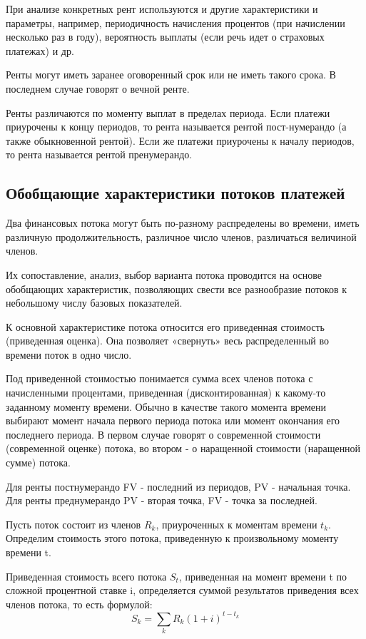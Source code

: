 \documentclass[aps,%
12pt,%
final,%
oneside,
onecolumn,%
musixtex, %
superscriptaddress,%
centertags]{article} %
\begin{document}
При анализе конкретных рент используются и другие характеристики и параметры, например, периодичность начисления процентов (при начислении несколько раз в году), вероятность выплаты (если речь идет о страховых платежах) и др.

Ренты могут иметь заранее оговоренный срок или не иметь такого срока. В последнем случае говорят о вечной ренте.

Ренты различаются по моменту выплат в пределах периода. Если платежи приурочены к концу периодов, то рента называется рентой пост-нумерандо (а также обыкновенной рентой). Если же платежи приурочены к началу периодов, то рента называется рентой пренумерандо.

\subsection{Обобщающие характеристики потоков платежей}

Два финансовых потока могут быть по-разному распределены во времени, иметь различную продолжительность, различное число членов, различаться величиной членов.

Их сопоставление, анализ, выбор варианта потока проводится на основе обобщающих характеристик, позволяющих свести все разнообразие потоков к небольшому числу базовых показателей.

К основной характеристике потока относится его приведенная стоимость (приведенная оценка). Она позволяет «свернуть» весь распределенный во времени поток в одно число.

Под приведенной стоимостью понимается сумма всех членов потока с начисленными процентами, приведенная (дисконтированная) к какому-то заданному моменту времени. Обычно в качестве такого момента времени выбирают момент начала первого периода потока или момент окончания его последнего периода. В первом случае говорят о современной стоимости (современной оценке) потока, во втором - о наращенной стоимости (наращенной сумме) потока.

Для ренты постнумерандо FV - последний из периодов, PV - начальная точка. Для ренты преднумерандо PV - вторая точка, FV - точка за последней.

Пусть поток состоит из членов $R_k$, приуроченных к моментам времени $t_k$. Определим стоимость этого потока, приведенную к произвольному моменту времени t.

Приведенная стоимость всего потока $S_t$, приведенная на момент времени t по сложной процентной ставке i, определяется суммой результатов приведения всех членов потока, то есть формулой:
$$S_k = \sum_{k} R_k (1+i)^{t-t_k}$$
\end{document}
